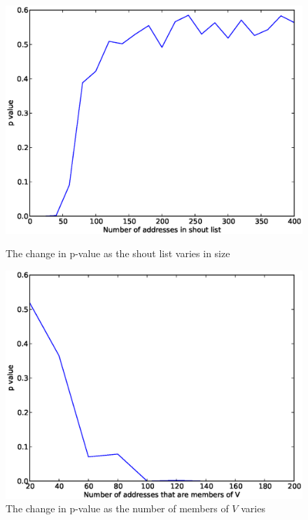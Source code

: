 \documentclass[ %
                    author={Luke Murray},
                supervisor={Dr. Simon Hollis},
                     title={Shadow Peer-to-Peer Networks},
                  subtitle={},
                    degree={MEng},
                      year={2013} ]{thesis}
\begin{document}
\begin{figure}[h]
    \centering
    \begin{minipage}[b]{0.45\linewidth}
        \centering
        \includegraphics[width=\linewidth]{diagrams/variable_l.eps}
        \caption{The change in p-value as the shout list varies in size}
        \label{variable_l}
    \end{minipage}
    \begin{minipage}[b]{0.45\linewidth}
        \centering
        \includegraphics[width=\linewidth]{diagrams/variable_v.eps}
        \caption{The change in p-value as the number of members of $V$ varies}
        \label{variable_v}
    \end{minipage}
\end{figure}
\end{document}

